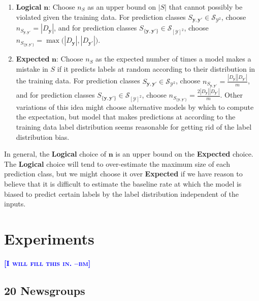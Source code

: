\documentclass{article} %
\newcommand{\bmcomment}[1]{\textcolor{blue}{\textsc{\textbf{[#1 --bm]}}}}
\begin{document}
\begin{enumerate}

\item \textbf{Logical} $\mathbf{n}$: Choose $n_S$ as an upper bound
on $|S|$ that cannot possibly be violated given the training data. 
For prediction classes 
$S_{\mathbf{y},\mathbf{y'}}\in\mathcal{S}_{\mathcal{Y}^2}$, 
choose $n_{S_{\mathbf{y},\mathbf{y'}}}=|D_\mathbf{y}|$, and for prediction 
classes 
$S_{\{\mathbf{y},\mathbf{y'}\}}\in\mathcal{S}_{[\mathcal{Y}]^2}$,
choose 
$n_{S_{\{\mathbf{y},\mathbf{y'}\}}}=
\max\big(|D_\mathbf{y}|,|D_\mathbf{y'}|\big)$.

\item \textbf{Expected} $\mathbf{n}$:  Choose $n_S$ as the expected
number of times a model makes a mistake in $S$ if it predicts labels
at random according to their distribution in the training data. 
For prediction classes 
$S_{\mathbf{y},\mathbf{y'}}\in\mathcal{S}_{\mathcal{Y}^2}$, 
choose $n_{S_{\mathbf{y},\mathbf{y'}}}=
\frac{|D_\mathbf{y}||D_\mathbf{y'}|}{m}$, 
and for prediction classes 
$S_{\{\mathbf{y},\mathbf{y'}\}}\in\mathcal{S}_{[\mathcal{Y}]^2}$,
choose 
$n_{S_{\{\mathbf{y},\mathbf{y'}\}}}=
\frac{2|D_\mathbf{y}||D_\mathbf{y'}|}{m}$.
Other variations of this idea might choose alternative models by which
to compute the expectation, but model that makes predictions at
according to the training data label distribution seems 
reasonable for getting rid of the label distribution bias.

\end{enumerate}

In general, the \textbf{Logical} choice of $\mathbf{n}$ is an upper
bound on the \textbf{Expected} choice.  The \textbf{Logical} choice
will tend to over-estimate the maximum size of each prediction class,
but we might choose it over \textbf{Expected} if we have reason
to believe that it is difficult to estimate the baseline rate at
which the model is biased to predict certain labels by the label
distribution independent of the inputs.

\section{Experiments}

\bmcomment{I will fill this in.}

\subsection{20 Newsgroups}
\end{document}
